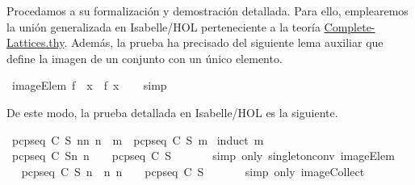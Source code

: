 \begin{isabellebody}
\begin{isamarkuptext}
  Procedamos a su formalización y demostración detallada. Para ello, emplearemos la unión 
  generalizada en Isabelle/HOL perteneciente a la teoría 
  \href{https://n9.cl/gtf5x}{Complete-Lattices.thy}. Además, la prueba ha precisado del 
  siguiente lema auxiliar que define la imagen de un conjunto con un único elemento.%
\end{isamarkuptext}\isamarkuptrue%
\isamarkupfalse%
\ imageElem{\isacharcolon}\ {\isachardoublequoteopen}f\ {\isacharbackquote}\ {\isacharbraceleft}x{\isacharbraceright}\ {\isacharequal}\ {\isacharbraceleft}f\ x{\isacharbraceright}{\isachardoublequoteclose}\isanewline
%
\isadelimproof
\ \ %
\endisadelimproof
%
\isatagproof
{}\isamarkupfalse%
\ simp%
\endisatagproof
{\isafoldproof}%
%
\isadelimproof
%
\endisadelimproof
%
\begin{isamarkuptext}%
De este modo, la prueba detallada en Isabelle/HOL es la siguiente.%
\end{isamarkuptext}\isamarkuptrue%
\isamarkupfalse%
\ {\isachardoublequoteopen}{\isasymUnion}{\isacharbraceleft}pcp{\isacharunderscore}seq\ C\ S\ n{\isacharbar}n{\isachardot}\ n\ {\isasymle}\ m{\isacharbraceright}\ {\isacharequal}\ pcp{\isacharunderscore}seq\ C\ S\ m{\isachardoublequoteclose}\isanewline
%
\isadelimproof
%
\endisadelimproof
%
\isatagproof
{}\isamarkupfalse%
\ {\isacharparenleft}induct\ m{\isacharparenright}\isanewline
\ \ \isamarkupfalse%
\ {\isachardoublequoteopen}{\isacharparenleft}pcp{\isacharunderscore}seq\ C\ S{\isacharparenright}{\isacharbackquote}{\isacharbraceleft}n{\isachardot}\ n\ {\isacharequal}\ {}{\isacharbraceright}\ {\isacharequal}\ {\isacharbraceleft}pcp{\isacharunderscore}seq\ C\ S\ {}{\isacharbraceright}{\isachardoublequoteclose}\isanewline
\ \ \ \ \isamarkupfalse%
\ {\isacharparenleft}simp\ only{\isacharcolon}\ singleton{\isacharunderscore}conv\ imageElem{\isacharparenright}\isanewline
\ \ \isamarkupfalse%
\ \isamarkupfalse%
\ {}{\isacharcolon}{\isachardoublequoteopen}{\isasymUnion}{\isacharbraceleft}pcp{\isacharunderscore}seq\ C\ S\ n\ {\isacharbar}\ n{\isachardot}\ n\ {\isacharequal}\ {}{\isacharbraceright}\ {\isacharequal}\ {\isasymUnion}{\isacharbraceleft}pcp{\isacharunderscore}seq\ C\ S\ {}{\isacharbraceright}{\isachardoublequoteclose}\isanewline
\ \ \ \ \isamarkupfalse%
\ {\isacharparenleft}simp\ only{\isacharcolon}\ image{\isacharunderscore}Collect{\isacharparenright}\isanewline

\end{isabellebody}
